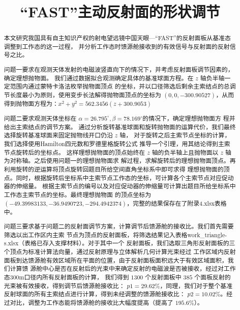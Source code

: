 \documentclass[withoutpreface,bwprint]{cumcmthesis} %
\title{“FAST”主动反射面的形状调节}
\begin{document}
\maketitle
\begin{abstract}
本文研究我国具有自主知识产权的射电望远镜中国天眼---“FAST”的反射面板从基准态调整到工作态的这一过程，
并分析工作态时馈源舱接收到的有效信号与反射面的反射信号之比。

问题一要求在观测天体发射的电磁波竖直向下的情况下，并考虑反射面板调节因素的，确定理想抛物面。
我们通过数据拟合观测确定具体的基准球面方程。在 $z$ 轴负半轴一定范围内通过蒙特卡洛法枚举抛物面顶点
的坐标，并以口径筛选后剩余主索结点的总调节长度最小为原则，使用变步长法解得抛物面顶点的坐标为
$(0,0,-300.90527)$，从而得到抛物面方程为：$x^2+y^2=562.3456(z+300.9053)$

问题二要求观测天体坐标在 $\alpha =26.795^\circ,\beta =78.169^\circ$的情况下，确定理想抛物面方
程并给出主索结点的调节方案。
通过分析旋转基准球面和旋转抛物面的运算代价，我们最终选择旋转基准球面来固定抛物线开口仍沿 $z$ 轴，
对于旋转之后主索节点坐标的计算，我们选择使用Hamilton四元数\cite{Hamilton2006}和罗德里格旋转公式
推导一个引理，用其结论得到主索节点旋转后的坐标点。
这样理想抛物面的顶点始终在 $z$ 轴的负半轴上且抛物面以 $z$ 轴为对称轴。之后使用问题一的理想抛物面求
解过程，求解旋转后的理想抛物面顶点。再利用旋转的逆运算将顶点旋转回题目所给空间直角坐标系中即可求得
理想抛物面的顶点。同时，根据旋转后坐标系中主索节点工作态的坐标，可计算各个主索节点对应促动器的伸缩量。
根据主索节点的编号以及对应促动器的伸缩量可计算出题目所给坐标系中工作态主索节点的坐标。最终理想抛物面
的顶点坐标为 $(-49.39983133,-36.9490723,-294.4942374)$，完整的结果保存在了附录4.xlsx表格中。

问题三要求基于问题二的反射面调节方案，计算调节后馈源舱的接收比。我们首先需要筛选以出工作区内主索
节点为顶点的反射面板，将筛选结果记入表格work\_triangle-s.xlsx（表格已存入支撑材料）。对于其中一个
反射面板，我们选取三角形反射面板的三个顶点为标准计算法向量，通过反射原理与立体解析几何计算光束经过
工作区域内反射面板到达馈源舱有效区域所在平面的位置，由于反射面板面积远大于有效区域面积，我们计算馈
源舱中心是否在反射后的光束中来确定反射的电磁波是否被接收，经过对工作态300m口径内所有反射面板的计算，
我们得到 $1300$ 个反射面板中 $385$ 个面板反射的光束被有效接收，得到调节后馈源舱接收比：
$p1 = 29.62\%$，同理，我们对于整个基准反射球面的所有主索结点进行计算，得到未经调整的馈源舱接收比：
$p2 = 10.02\%$。经过对比，调整为工作态能将馈源舱的接收比大幅度提高（提高了 $195.6\%$）。

\end{abstract}
\end{document}

